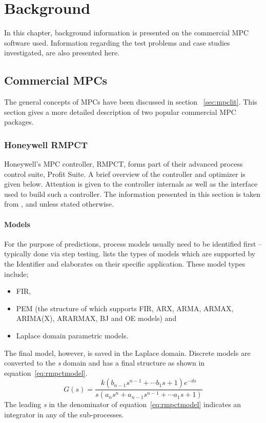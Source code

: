 \chapter{Background}\label{chap:background}
\begin{overview}
  In this chapter, background information is presented on the commercial MPC software used. 
  Information regarding the test problems and case studies investigated, are also presented here.
\end{overview}

\section{Commercial MPCs}
The general concepts of MPCs have been discussed in section ~\ref{sec:mpclit}.
This section gives a more detailed description of two popular commercial MPC packages.
\subsection{Honeywell RMPCT}
Honeywell's MPC controller, RMPCT, forms part of their advanced process control suite, Profit Suite.
A brief overview of the controller and optimizer is given below. 
Attention is given to the controller internals as well as the interface used to build such a controller.
The information presented in this section is taken from \citet{honeywell1}, \citet{honeywell2} and \citet{honeywell3} unless stated otherwise.

\subsubsection{Models}
For the purpose of predictions, process models usually need to be identified first -- typically done via step testing.
\citet{honeywell3} lists the types of models which are supported by the Identifier and elaborates on their specific application.
These model types include;
\begin{itemize}
\item FIR,
\item PEM (the structure of which supports FIR, ARX, ARMA, ARMAX, ARIMA(X), ARARMAX, BJ and OE models) and
\item Laplace domain parametric models.
\end{itemize}
The final model, however, is saved in the Laplace domain.
Discrete models are converted to the {\it s} domain and has a final structure as shown in equation~\ref{eq:rmpctmodel}.
\begin{equation}
  \label{eq:rmpctmodel}
  G(s) = \frac{k(b_{n-1}s^{n-1}+ \cdots b_1s+1)e^{-ds}} {s(a_ns^n+a_{n-1}s^{n-1}+ \cdots a_1s+1)}
\end{equation}
The leading {\it s} in the denominator of equation~\ref{eq:rmpctmodel} indicates an integrator in any of the sub-processes.

